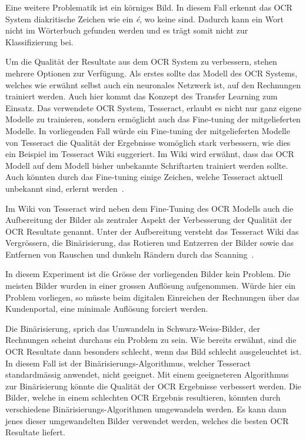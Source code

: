 Eine weitere Problematik ist ein körniges Bild. In diesem Fall erkennt das OCR System diakritische Zeichen wie ein \textit{é}, wo keine sind. Dadurch kann ein Wort nicht im Wörterbuch gefunden werden und es trägt somit nicht zur Klassifizierung bei.

Um die Qualität der Resultate aus dem OCR System zu verbessern, stehen mehrere Optionen zur Verfügung. Als erstes sollte das Modell des OCR Systems, welches wie erwähnt selbst auch ein neuronales Netzwerk ist, auf den Rechnungen trainiert werden. Auch hier kommt das Konzept des Transfer Learning zum Einsatz. Das verwendete OCR System, Tesseract, erlaubt es nicht nur ganz eigene Modelle zu trainieren, sondern ermöglicht auch das Fine-tuning der mitgelieferten Modelle. In vorliegenden Fall würde ein Fine-tuning der mitgelieferten Modelle von Tesseract die Qualität der Ergebnisse womöglich stark verbessern, wie dies ein Beispiel im Tesseract Wiki suggeriert. Im Wiki wird erwähnt, dass das OCR Modell auf dem Modell bisher unbekannte Schriftarten trainiert werden sollte. Auch könnten durch das Fine-tuning einige Zeichen, welche Tesseract aktuell unbekannt sind, erlernt werden~\autocite{TesseractTraining}.

Im Wiki von Tesseract wird neben dem Fine-Tuning des OCR Modells auch die Aufbereitung der Bilder als zentraler Aspekt der Verbesserung der Qualität der OCR Resultate genannt. Unter der Aufbereitung versteht das Tesseract Wiki das Vergrössern, die Binärisierung, das Rotieren und Entzerren der Bilder sowie das Entfernen von Rauschen und dunkeln Rändern durch das Scanning~\autocite{TesseractQuality}.

In diesem Experiment ist die Grösse der vorliegenden Bilder kein Problem. Die meisten Bilder wurden in einer grossen Auflösung aufgenommen. Würde hier ein Problem vorliegen, so müsste beim digitalen Einreichen der Rechnungen über das Kundenportal, eine minimale Auflösung forciert werden.

Die Binärisierung, sprich das Umwandeln in Schwarz-Weiss-Bilder, der Rechnungen scheint durchaus ein Problem zu sein. Wie bereits erwähnt, sind die OCR Resultate dann besonders schlecht, wenn das Bild schlecht ausgeleuchtet ist. In diesem Fall ist der Binärisierungs-Algorithmus, welcher Tesseract standardmässig anwendet, nicht geeignet. Mit einem geeigneteren Algorithmus zur Binärisierung könnte die Qualität der OCR Ergebnisse verbessert werden. Die Bilder, welche in einem schlechten OCR Ergebnis resultieren, könnten durch verschiedene Binärisierungs-Algorithmen umgewandeln werden. Es kann dann jenes dieser umgewandelten Bilder verwendet werden, welches die besten OCR Resultate liefert.


